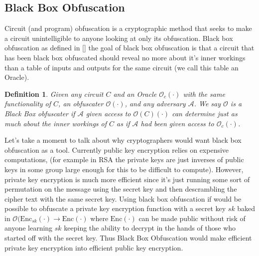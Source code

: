 \documentclass[12pt,twoside]{reedthesis}
\newtheorem{definition}{Definition}
\newcommand{\enc}[0]{\text{Enc}}
\begin{document}
    \subsection{Black Box Obfuscation}
     \par Circuit (and program) obfuscation is a cryptographic method that seeks to make a circuit
    unintelligible to anyone looking at only its obfuscation. Black box obfuscation as defined in [\cite{vbb}] the goal of black box obfuscation is that a circuit that has been black box obfuscated should reveal no more about it's inner workings than a table of inputs and outputs for the same circuit (we call this table an Oracle).
    
    \begin{definition}
    Given any circuit $C$ and an Oracle $\mathcal{O}_c(\cdot)$ with the same functionality of $C$, an obfuscater $\mathcal{O}(\cdot)$, and any adversary $\mathcal{A}$. We say $\mathcal{O}$ is a Black Box obfuscater if $\mathcal{A}$ given access to $\mathcal{O}(C)(\cdot)$ can determine just as much about the inner workings of $C$ as if $\mathcal{A}$ had been given access to $\mathcal{O}_c(\cdot)$.    
    
    \end{definition}
        
     \par Let's take a moment to talk about why cryptographers would want black box obfuscation as a tool. Currently public key encryption relies on expensive computations, (for example in RSA the private keys are just inverses of public keys in some group large enough for this to be difficult to compute). However, private key encryption is much more efficient since it's just running some sort of permutation on the message using the secret key and then descrambling the cipher text with the same secret key. Using black box obfuscation if would be possible to obfuscate a private key encryption function with a secret key $sk$ baked in $\mathcal{O}(\enc_{sk}(\cdot) \rightarrow \enc(\cdot)$ where $\enc(\cdot)$ can be made public without risk of anyone learning $sk$ keeping the ability to decrypt in the hands of those who started off with the secret key. Thus Black Box Obfuscation would make efficient private key encryption into efficient public key encryption.
    
\end{document}
